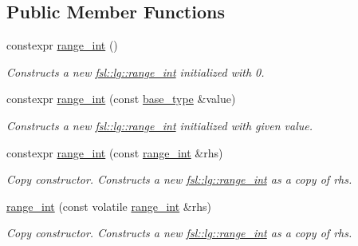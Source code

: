 \subsection*{Public Member Functions}
\begin{DoxyCompactItemize}
\item 
\mbox{\label{classfsl_1_1lg_1_1range__int_abfebc01a58cbbdae490816c076afbacf}} 
constexpr \mbox{\hyperlink{classfsl_1_1lg_1_1range__int_abfebc01a58cbbdae490816c076afbacf}{range\+\_\+int}} ()
\begin{DoxyCompactList}\small\item\em Constructs a new \mbox{\hyperlink{classfsl_1_1lg_1_1range__int}{fsl\+::lg\+::range\+\_\+int}} initialized with 0. \end{DoxyCompactList}\item 
constexpr \mbox{\hyperlink{classfsl_1_1lg_1_1range__int_a54f04ed17baa649329ea1f278f7f3020}{range\+\_\+int}} (const \mbox{\hyperlink{classfsl_1_1lg_1_1range__int_a4ce67cd216fd303b7bae83a7cbcab3bb}{base\+\_\+type}} \&value)
\begin{DoxyCompactList}\small\item\em Constructs a new \mbox{\hyperlink{classfsl_1_1lg_1_1range__int}{fsl\+::lg\+::range\+\_\+int}} initialized with given value. \end{DoxyCompactList}\item 
\mbox{\label{classfsl_1_1lg_1_1range__int_a03c96339bfbddb159d98113e85171c3e}} 
constexpr \mbox{\hyperlink{classfsl_1_1lg_1_1range__int_a03c96339bfbddb159d98113e85171c3e}{range\+\_\+int}} (const \mbox{\hyperlink{classfsl_1_1lg_1_1range__int}{range\+\_\+int}} \&rhs)
\begin{DoxyCompactList}\small\item\em Copy constructor. Constructs a new \mbox{\hyperlink{classfsl_1_1lg_1_1range__int}{fsl\+::lg\+::range\+\_\+int}} as a copy of {\itshape rhs}. \end{DoxyCompactList}\item 
\mbox{\label{classfsl_1_1lg_1_1range__int_ad33e4ece005ccb93628c1ce12d53581c}} 
\mbox{\hyperlink{classfsl_1_1lg_1_1range__int_ad33e4ece005ccb93628c1ce12d53581c}{range\+\_\+int}} (const volatile \mbox{\hyperlink{classfsl_1_1lg_1_1range__int}{range\+\_\+int}} \&rhs)
\begin{DoxyCompactList}\small\item\em Copy constructor. Constructs a new \mbox{\hyperlink{classfsl_1_1lg_1_1range__int}{fsl\+::lg\+::range\+\_\+int}} as a copy of {\itshape rhs}. \end{DoxyCompactList}\item 

\end{DoxyCompactItemize}
